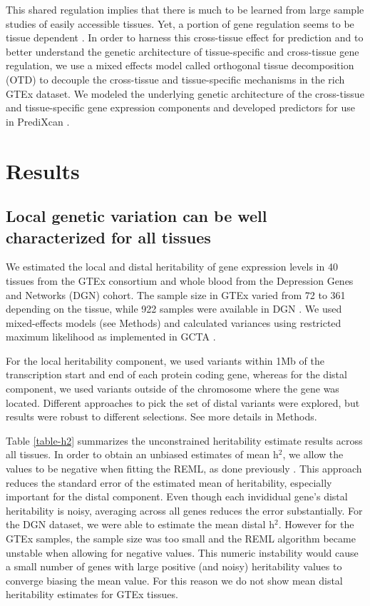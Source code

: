 \documentclass[10pt,letterpaper]{article}
\begin{document}
This shared regulation implies that there is much to be learned from large sample studies of easily accessible tissues. Yet, a portion of gene regulation seems to be tissue dependent \cite{Ardlie_2015}. In order to harness this cross-tissue effect for prediction and to better understand the genetic architecture of tissue-specific and cross-tissue gene regulation, we use a mixed effects model called orthogonal tissue decomposition (OTD) to decouple the cross-tissue and tissue-specific mechanisms in the rich GTEx dataset. We modeled the underlying genetic architecture of the cross-tissue and tissue-specific gene expression components and developed predictors for use in PrediXcan \cite{Gamazon_2015}.



\section*{Results}
\subsection*{Local genetic variation can be well characterized for all
tissues}\label{local-genetic-variation-can-be-well-characterized-for-all-tissues}

We estimated the local and distal heritability of gene expression levels in 40 tissues from the GTEx consortium and whole blood from the Depression Genes and Networks (DGN) cohort. The sample size in GTEx varied from 72 to 361 depending on the tissue, while 922 samples were available in DGN \cite{Battle_2013}. We used mixed-effects models (see Methods) and calculated variances using restricted maximum likelihood as implemented in GCTA \cite{Yang_2011}.

For the local heritability component, we used variants within 1Mb of the transcription start and end of each protein coding gene, whereas for the distal component, we used variants outside of the chromosome where the gene was located. Different approaches to pick the set of distal variants were explored, but results were robust to different selections. See more details in Methods.

Table \ref{table-h2} summarizes the unconstrained heritability estimate results across all tissues. In order to obtain an unbiased estimates of mean h$^2$, we allow the values to be negative when fitting the REML, as done previously \cite{Price_2011,Wright_2014}. This approach reduces the standard error of the estimated mean of heritability, especially important for the distal component. Even though each invididual gene's distal heritability is noisy, averaging across all genes reduces the error substantially. For the DGN dataset, we were able to estimate the mean distal h$^2$. However for the GTEx samples, the sample size was too small and the REML algorithm became unstable when allowing for negative values. This numeric instability would cause a small number of genes with large positive (and noisy) heritability values to converge biasing the mean value. For this reason we do not show mean distal heritability estimates for GTEx tissues. 
\end{document}
